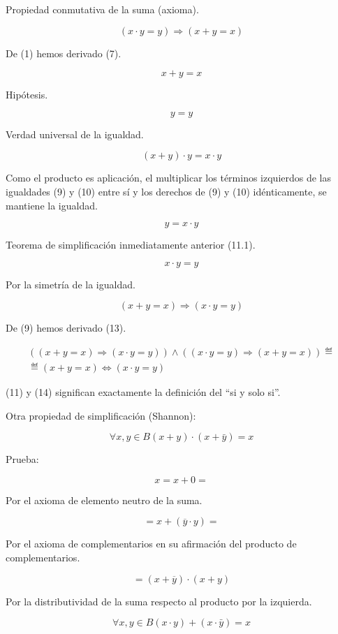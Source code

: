 Propiedad conmutativa de la suma (axioma).

\[{({{x \cdot y} = y})}\Rightarrow{({{x + y} = x})}\]

De (1) hemos derivado (7).

\[{x + y} = x\]

Hipótesis.

\[y = y\]

Verdad universal de la igualdad.

\[{{({x + y})} \cdot y} = {x \cdot y}\]

Como el producto es aplicación, el multiplicar los términos izquierdos
de las igualdades (9) y (10) entre sí y los derechos de (9) y (10)
idénticamente, se mantiene la igualdad.

\[y = {x \cdot y}\]

Teorema de simplificación inmediatamente anterior (11.1).

\[{x \cdot y} = y\]

Por la simetría de la igualdad.

\[{({{x + y} = x})}\Rightarrow{({{x \cdot y} = y})}\]

De (9) hemos derivado (13).

\[\begin{matrix}
{{\left( {{({{x + y} = x})}\Rightarrow{({{x \cdot y} = y})}} \right) \land \left( {{({{x \cdot y} = y})}\Rightarrow{({{x + y} = x})}} \right)} ≝} \\
{{≝ {({{x + y} = x})}}\Leftrightarrow{({{x \cdot y} = y})}}
\end{matrix}\]

(11) y (14) significan exactamente la definición del ``si y solo si''.

Otra propiedad de simplificación (Shannon):

\[\forall x,{y \in B}{{{({x + y})} \cdot {({x + \bar{y}})}} = x}\]

Prueba:

\[{x = {x + 0}} = {}\]

Por el axioma de elemento neutro de la suma.

\[{= {x + {({\overline{y} \cdot y})}}} =\]

Por el axioma de complementarios en su afirmación del producto de
complementarios.

\[= {{({x + \overline{y}})} \cdot {({x + y})}}\]

Por la distributividad de la suma respecto al producto por la izquierda.

\[\forall x,{y \in B}{{{({x \cdot y})} + {({x \cdot \bar{y}})}} = x}\]

